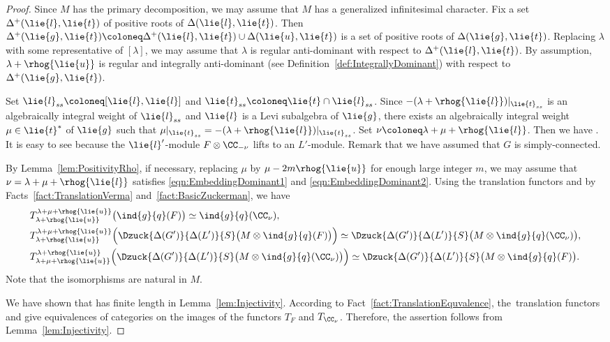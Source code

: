 \begin{proof}
	Since $M$ has the primary decomposition, we may assume that $M$ has a generalized infinitesimal character.
	Fix a set $\Delta^+(\lie{l}, \lie{t})$ of positive roots of $\Delta(\lie{l}, \lie{t})$.
	Then $\Delta^+(\lie{g}, \lie{t})\coloneq\Delta^+(\lie{l}, \lie{t}) \cup \Delta(\lie{u}, \lie{t})$ is a set of positive roots
	of $\Delta(\lie{g}, \lie{t})$.
	Replacing $\lambda$ with some representative of $[\lambda]$, we may assume that $\lambda$ is regular anti-dominant with respect to $\Delta^+(\lie{l}, \lie{t})$.
	By assumption, $\lambda + \rhog{\lie{u}}$ is regular and integrally anti-dominant (see Definition~\ref{def:IntegrallyDominant})
	with respect to $\Delta^+(\lie{g}, \lie{t})$.

	Set $\lie{l}_{ss}\coloneq[\lie{l}, \lie{l}]$
	and $\lie{t}_{ss}\coloneq \lie{t}\cap \lie{l}_{ss}$.
	Since $-(\lambda+\rhog{\lie{l}})|_{\lie{t}_{ss}}$ is an algebraically integral weight of $\lie{l}_{ss}$
	and $\lie{l}$ is a Levi subalgebra of $\lie{g}$,
	there exists an algebraically integral weight $\mu \in \lie{t}^*$ of $\lie{g}$
	such that $\mu|_{\lie{t}_{ss}}=-(\lambda+\rhog{\lie{l}})|_{\lie{t}_{ss}}$.
	Set $\nu\coloneq\lambda+\mu+\rhog{\lie{l}}$.
	Then we have .
	It is easy to see  because the $\lie{l}'$-module $F\otimes \CC_{-\nu}$ lifts to an $L'$-module.
	Remark that we have assumed that $G$ is simply-connected.

	By Lemma~\ref{lem:PositivityRho}, if necessary, replacing $\mu$ by $\mu-2m\rhog{\lie{u}}$ for enough large integer $m$,
	we may assume that $\nu=\lambda+\mu+\rhog{\lie{l}}$ satisfies \eqref{eqn:EmbeddingDominant1} and \eqref{eqn:EmbeddingDominant2}.
	Using the translation functors and by Facts~\ref{fact:TranslationVerma} and~\ref{fact:BasicZuckerman},
	we have
	\begin{align*}
		&T_{\lambda+\rhog{\lie{u}}}^{\lambda+\mu+\rhog{\lie{u}}}\bigl(\ind{g}{q}(F)\bigr)
 \simeq \ind{g}{q}(\CC_{\nu}),\\
		&T_{\lambda+\rhog{\lie{u}}}^{\lambda+\mu+\rhog{\lie{u}}}\Bigl(\Dzuck{\Delta(G')}{\Delta(L')}{S}\bigl(M\otimes \ind{g}{q}(F)\bigr)\Bigr)
 \simeq \Dzuck{\Delta(G')}{\Delta(L')}{S}\bigl(M\otimes \ind{g}{q}(\CC_{\nu})\bigr), \\
		&T_{\lambda+\mu+\rhog{\lie{u}}}^{\lambda+\rhog{\lie{u}}}\Bigl(\Dzuck{\Delta(G')}{\Delta(L')}{S}\bigl(M\otimes \ind{g}{q}(\CC_{\nu})\bigr)\Bigr)
 \simeq \Dzuck{\Delta(G')}{\Delta(L')}{S}\bigl(M\otimes \ind{g}{q}(F)\bigr).
	\end{align*}
	Note that the isomorphisms are natural in $M$.

	We have shown that  has finite length in Lemma~\ref{lem:Injectivity}.
According to Fact~\ref{fact:TranslationEquvalence}, the~translation functors  and  give equivalences of categories on the images of the functors $T_F$ and $T_{\CC_{\nu}}$.
	Therefore, the assertion follows from Lemma~\ref{lem:Injectivity}.
\end{proof}

